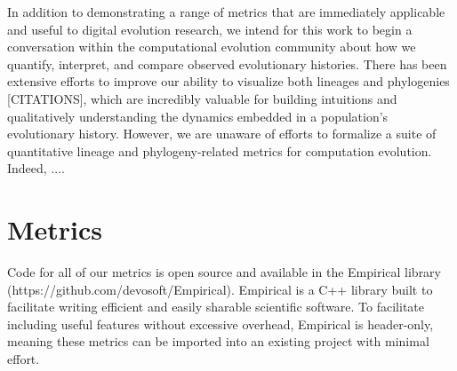 \documentclass[letterpaper]{article}
\begin{document}
In addition to demonstrating a range of metrics that are immediately applicable and useful to digital evolution research, we intend for this work to begin a conversation within the computational evolution community about how we quantify, interpret, and compare observed evolutionary histories. There has been extensive efforts to improve our ability to visualize both lineages and phylogenies [CITATIONS], which are incredibly valuable for building intuitions and qualitatively understanding the dynamics embedded in a population's evolutionary history. However, we are unaware of efforts to formalize a suite of quantitative lineage and phylogeny-related metrics for computation evolution. Indeed, .... %

\section{Metrics}

Code for all of our metrics is open source and available in the Empirical library (https://github.com/devosoft/Empirical). Empirical is a C++ library built to facilitate writing efficient and easily sharable scientific software. To facilitate including useful features without excessive overhead, Empirical is header-only, meaning these metrics can be imported into an existing project with minimal effort.
\end{document}
